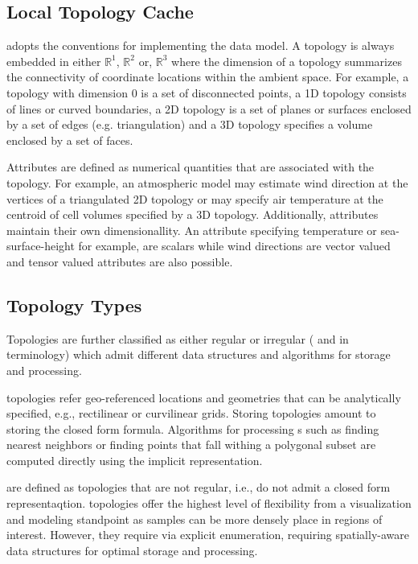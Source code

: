 \subsection{Local Topology Cache}

\sciwms{} adopts the \cfugrid{} conventions for implementing the data
model. A topology is always embedded in either $\mathbb{R}^1$,
$\mathbb{R}^2$ or, $\mathbb{R}^3$ where the dimension of a topology
summarizes the connectivity of coordinate locations within the ambient
space. For example, a topology with dimension 0 is a set of
disconnected points, a 1D topology consists of lines or curved
boundaries, a 2D topology is a set of planes or surfaces enclosed by a
set of edges (e.g. triangulation) and a 3D topology specifies a volume
enclosed by a set of faces.

Attributes are defined as numerical quantities that are associated
with the topology. For example, an atmospheric model may estimate wind
direction at the vertices of a triangulated 2D topology or may specify
air temperature at the centroid of cell volumes specified by a 3D
topology. Additionally, attributes maintain their own
dimensionallity. An attribute specifying temperature or
sea-surface-height for example, are scalars while wind directions are
vector valued and tensor valued attributes are also possible.

\subsection{Topology Types}
Topologies are further classified as either regular or irregular ({\bf
  \cgrid{}} and {\bf \ugrid} in \sciwms{} terminology) which admit
different data structures and algorithms for storage and processing.

{\bf \cgrid{}} topologies refer geo-referenced locations and geometries that can be analytically specified, e.g., rectilinear
or curvilinear grids. Storing \cgrid{} topologies amount to storing
the closed form formula. Algorithms for processing \cgrid{}s such as
finding nearest neighbors or finding points that fall withing a
polygonal subset are computed directly using the implicit \cgrid{}
representation.

{\bf \ugrid{}} are defined as topologies that are not regular, i.e.,
do not admit a closed form representaqtion. \ugrid{} topologies offer
the highest level of flexibility from a visualization and modeling
standpoint as samples can be more densely place in regions of
interest. However, they require via explicit enumeration, requiring
spatially-aware data structures for optimal storage and processing.

